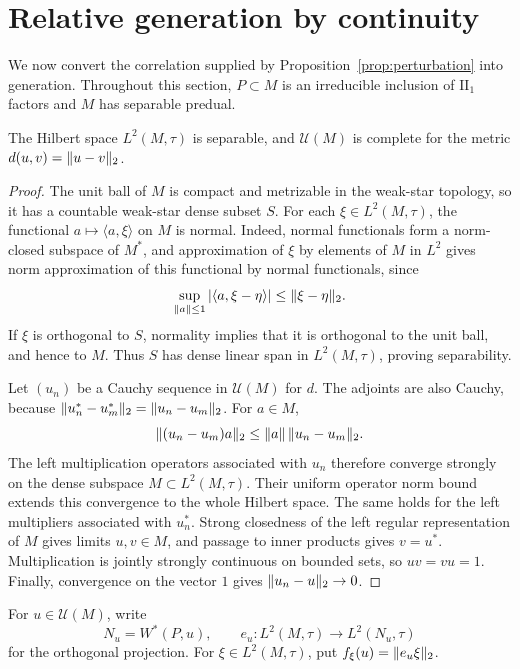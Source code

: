 \section{Relative generation by continuity}
\label{sec:relative-generation}

We now convert the correlation supplied by Proposition~\ref{prop:perturbation}
into generation. Throughout this section, $P\subset M$ is an irreducible
inclusion of $\mathrm{II}_1$ factors and $M$ has separable predual.

\begin{lemma}
\label{lem:unitary-completeness}
The Hilbert space $L^2(M,\tau)$ is separable, and
$\mathcal U(M)$ is complete for the metric $d(u,v)=\lVert u-v\rVert_2$.
\end{lemma}

\begin{proof}
The unit ball of $M$ is compact and metrizable in the weak-star topology,
so it has a countable weak-star dense subset $S$. For each
$\xi\in L^2(M,\tau)$, the functional
$a\mapsto\langle a,\xi\rangle$ on $M$ is normal. Indeed, normal
functionals form a norm-closed subspace of $M^*$, and approximation
of $\xi$ by elements of $M$ in $L^2$ gives norm approximation of
this functional by normal functionals, since
\[
 \sup_{\lVert a\rVert\leq1}
 |\langle a,\xi-\eta\rangle|
 \leq\lVert \xi-\eta\rVert_2.
\]
If $\xi$ is orthogonal to $S$, normality implies that it is orthogonal to
the unit ball, and hence to $M$. Thus $S$ has dense linear span in
$L^2(M,\tau)$, proving separability.

Let $(u_n)$ be a Cauchy sequence in $\mathcal U(M)$ for $d$.
The adjoints are also Cauchy, because
$\lVert u_n^*-u_m^*\rVert_2=\lVert u_n-u_m\rVert_2$.
For $a\in M$,
\[
 \lVert (u_n-u_m)a\rVert_2\leq\lVert a\rVert\,\lVert u_n-u_m\rVert_2.
\]
The left multiplication operators associated with $u_n$ therefore
converge strongly on the dense subspace $M\subset L^2(M,\tau)$.
Their uniform operator norm bound extends this convergence to the whole
Hilbert space. The same holds for the left multipliers associated with
$u_n^*$. Strong closedness of the left regular representation of $M$
gives limits $u,v\in M$, and passage to inner products gives $v=u^*$.
Multiplication is jointly strongly continuous on bounded sets, so
$uv=vu=1$. Finally, convergence on the vector $1$ gives
$\lVert u_n-u\rVert_2\to0$.
\end{proof}

For $u\in\mathcal U(M)$, write
\[
 N_u=W^*(P,u),\qquad
 e_u:L^2(M,\tau)\longrightarrow L^2(N_u,\tau)
\]
for the orthogonal projection. For $\xi\in L^2(M,\tau)$, put
$f_\xi(u)=\lVert e_u\xi\rVert_2$.

